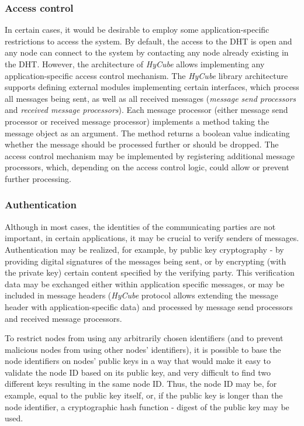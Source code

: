 \subsubsection{Access control}

In certain cases, it would be desirable to employ some application-specific restrictions to access the system. By default, the access to the DHT is open and any node can connect to the system by contacting any node already existing in the DHT. However, the architecture of \emph{HyCube} allows implementing any application-specific access control mechanism.  The \emph{HyCube} library architecture supports defining external modules implementing certain interfaces, which process all messages being sent, as well as all received messages (\emph{message send processors} and \emph{received message processors}). Each message processor (either message send processor or received message processor) implements a method taking the message object as an argument. The method returns a boolean value indicating whether the message should be processed further or should be dropped. The access control mechanism may be implemented by registering additional message processors, which, depending on the access control logic, could allow or prevent further processing.


\subsubsection{Authentication}

Although in most cases, the identities of the communicating parties are not important, in certain applications, it may be crucial to verify senders of messages. Authentication may be realized, for example, by public key cryptography - by providing digital signatures of the messages being sent, or by encrypting (with the private key) certain content specified by the verifying party. This verification data may be exchanged either within application specific messages, or may be included in message headers (\emph{HyCube} protocol allows extending the message header with application-specific data) and processed by message send processors and received message processors.

To restrict nodes from using any arbitrarily chosen identifiers (and to prevent malicious nodes from using other nodes' identifiers), it is possible to base the node identifiers on nodes' public keys in a way that would make it easy to validate the node ID based on its public key, and very difficult to find two different keys resulting in the same node ID. Thus, the node ID may be, for example, equal to the public key itself, or, if the public key is longer than the node identifier, a cryptographic hash function - digest of the public key may be used.

